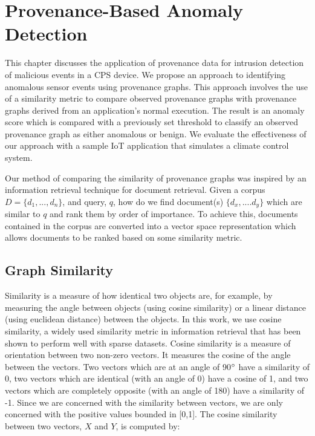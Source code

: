 
\chapter{Provenance-Based Anomaly Detection} \label{sec:prov_anomaly}
This chapter discusses the application of provenance data for intrusion detection of malicious events in a CPS device. We propose an approach to identifying anomalous sensor events using provenance graphs. This approach involves the use of a similarity metric to compare observed provenance graphs with provenance graphs derived from an application's normal execution. The result is an anomaly score which is  compared with a previously set threshold to classify an observed provenance graph as either anomalous or benign. We evaluate the effectiveness of our approach with a sample IoT application that simulates a climate control system.
 
 \par Our method of comparing the similarity of provenance graphs was inspired by an information retrieval technique for document retrieval. Given a corpus $D = \{ d_1,..., d_n\}$, and query, $q$, how do we find document(s) $\{d_x,....d_y\}$ which are similar to $q$ and rank them by order of importance. To achieve this, documents contained in the corpus are converted into a vector space representation which allows documents to be ranked based on some similarity metric.


\section{Graph Similarity} \label{similarity}
Similarity is a measure of how identical two objects are, for example, by measuring the angle between objects (using cosine similarity) or a linear distance (using euclidean distance) between the objects. In this work, we use cosine similarity, a widely used similarity metric in information retrieval that has been shown to perform well with sparse datasets. Cosine similarity is a measure of orientation between two non-zero vectors. It measures the cosine of the angle between the vectors. Two vectors which are at an angle of 90$\degree$ have a similarity of 0, two vectors which are identical (with an angle of 0\degree) have a cosine of 1, and two vectors which are completely opposite (with an angle of 180\degree) have a similarity of -1. Since we are concerned with the similarity between vectors, we are only concerned with the positive values bounded in [0,1]. The cosine similarity between two vectors, $X$ and $Y$, is computed by:

